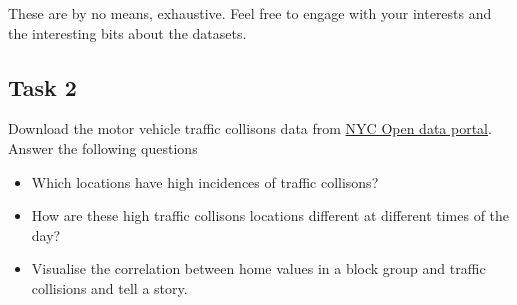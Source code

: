 \documentclass[]{article}
\providecommand{\tightlist}{%
  \setlength{\itemsep}{0pt}\setlength{\parskip}{0pt}}
\begin{document}
These are by no means, exhaustive. Feel free to engage with your
interests and the interesting bits about the datasets.

\subsection{Task 2}\label{task-2}

Download the motor vehicle traffic collisons data from
\href{https://data.cityofnewyork.us/Public-Safety/NYPD-Motor-Vehicle-Collisions/h9gi-nx95}{NYC
Open data portal}. Answer the following questions

\begin{itemize}
\tightlist
\item
  Which locations have high incidences of traffic collisons?
\item
  How are these high traffic collisons locations different at different
  times of the day?
\item
  Visualise the correlation between home values in a block group and
  traffic collisions and tell a story.
\end{itemize}
\end{document}
